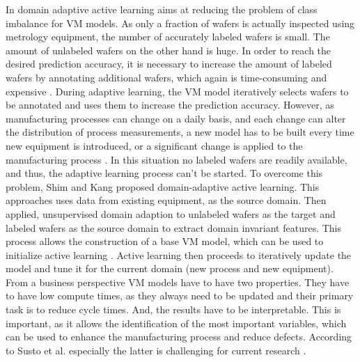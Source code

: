 \documentclass{Academic}
\begin{document}
    In domain adaptive active learning aims at reducing the problem of class imbalance for VM models. As only a fraction of wafers is actually inspected using metrology equipment, the number of accurately labeled wafers is small. The amount of unlabeled wafers on the other hand is huge. In order to reach the desired prediction accuracy, it is necessary to increase the amount of labeled wafers by annotating additional wafers, which again is time-consuming and expensive \cite{shim_domain-adaptive_2022}. During adaptive learning, the VM model iteratively selects wafers to be annotated and uses them to increase the prediction accuracy. However, as manufacturing processes can change on a daily basis, and each change can alter the distribution of process measurements, a new model has to be built every time new equipment is introduced, or a significant change is applied to the manufacturing process \cite{shim_domain-adaptive_2022}. In this situation no labeled wafers are readily available, and thus, the adaptive learning process can't be started. To overcome this problem, Shim and Kang \cite{shim_domain-adaptive_2022} proposed domain-adaptive active learning. This approaches uses data from existing equipment, as the source domain. Then applied, unsupervised domain adaption to unlabeled wafers as the target and labeled wafers as the source domain to extract domain invariant features. This process allows the construction of a base VM model, which can be used to initialize active learning \cite{shim_domain-adaptive_2022}. Active learning then proceeds to iteratively update the model and tune it for the current domain (new process and new equipment).
    From a business perspective VM models have to have two properties. They have to have low compute times, as they always need to be updated and their primary task is to reduce cycle times. And, the results have to be interpretable. This is important, as it allows the identification of the most important variables, which can be used to enhance the manufacturing process and reduce defects. According to Susto et al. especially the latter is challenging for current research \cite{susto_automatic_2012}.
\end{document}
